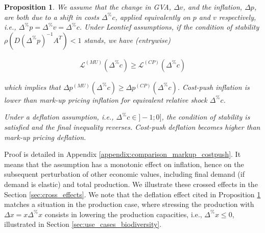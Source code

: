 \documentclass{article}
\newtheorem{proposition}{Proposition}
\begin{document}
\begin{proposition}
\label{proposition:comparison_markup_costpush}
We assume that the change in GVA, $\Delta v$, and the inflation, $\Delta p$, are both due to a shift in costs $\Delta^{\%} c$, applied equivalently on $p$ and $v$ respectively, i.e., $\Delta^{\%} p = \Delta^{\%} v = \Delta^{\%} c$. 
    Under Leontief assumptions, if the condition of stability $\rho(D(\Delta^\% p)^{-1} A^T)<1$ stands, we have (entrywise)
    
    \begin{align}
         \mathcal{L}^{(MU)}(\Delta^{\%} c) \geq \mathcal{L}^{(CP)}(\Delta^{\%} c)
    \end{align}
	
    \noindent which implies that $\Delta p^{(MU)}(\Delta^\%c) \geq \Delta p^{(CP)}(\Delta^\%c)$. Cost-push inflation is lower than mark-up pricing inflation for equivalent relative shock $\Delta^{\%} c$.

    Under a deflation assumption, i.e., $\Delta^{\%} c \in ]-1;0]$, the condition of stability is satisfied and the final inequality reverses. Cost-push deflation becomes higher than mark-up pricing deflation. 
\end{proposition}

\noindent Proof is detailed in Appendix \ref{appendix:comparison_markup_costpush}. It means that the assumption has a monotonic effect on inflation, hence on the subsequent perturbation of other economic values, including final demand (if demand is elastic) and total production. We illustrate these crossed effects in the Section \ref{sec:cross_effects}. We note that the deflation effect cited in Proposition \ref{proposition:comparison_markup_costpush} matches a situation in the production case, where stressing the production with $\Delta x=x\Delta^\% x$ consists in lowering the production capacities, i.e., $\Delta^\% x \leq 0$, illustrated in Section \ref{sec:use_cases_biodiversity}. 

\vspace{0.1cm}
\end{document}
